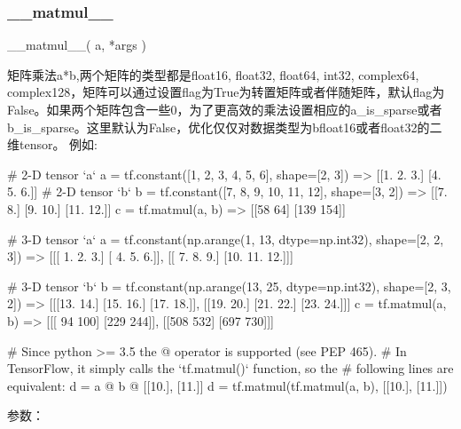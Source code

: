 \subsubsection{\_\_matmul\_\_}
\begin{python}
__matmul__(
    a,
    *args
)
\end{python}
矩阵乘法a*b,两个矩阵的类型都是float16, float32, float64, int32, complex64, complex128，矩阵可以通过设置flag为True为转置矩阵或者伴随矩阵，默认flag为False。如果两个矩阵包含一些0，为了更高效的乘法设置相应的a\_is\_sparse或者b\_is\_sparse。这里默认为False，优化仅仅对数据类型为bfloat16或者float32的二维tensor。
例如:

\begin{python}
# 2-D tensor `a`
a = tf.constant([1, 2, 3, 4, 5, 6], shape=[2, 3]) => [[1. 2. 3.]
                                                      [4. 5. 6.]]
# 2-D tensor `b`
b = tf.constant([7, 8, 9, 10, 11, 12], shape=[3, 2]) => [[7. 8.]
                                                         [9. 10.]
                                                         [11. 12.]]
c = tf.matmul(a, b) => [[58 64]
                        [139 154]]

# 3-D tensor `a`
a = tf.constant(np.arange(1, 13, dtype=np.int32),
                shape=[2, 2, 3])                  => [[[ 1.  2.  3.]
                                                       [ 4.  5.  6.]],
                                                      [[ 7.  8.  9.]
                                                       [10. 11. 12.]]]

# 3-D tensor `b`
b = tf.constant(np.arange(13, 25, dtype=np.int32),
                shape=[2, 3, 2])                   => [[[13. 14.]
                                                        [15. 16.]
                                                        [17. 18.]],
                                                       [[19. 20.]
                                                        [21. 22.]
                                                        [23. 24.]]]
c = tf.matmul(a, b) => [[[ 94 100]
                         [229 244]],
                        [[508 532]
                         [697 730]]]

# Since python >= 3.5 the @ operator is supported (see PEP 465).
# In TensorFlow, it simply calls the `tf.matmul()` function, so the
# following lines are equivalent:
d = a @ b @ [[10.], [11.]]
d = tf.matmul(tf.matmul(a, b), [[10.], [11.]])
\end{python}
参数：
